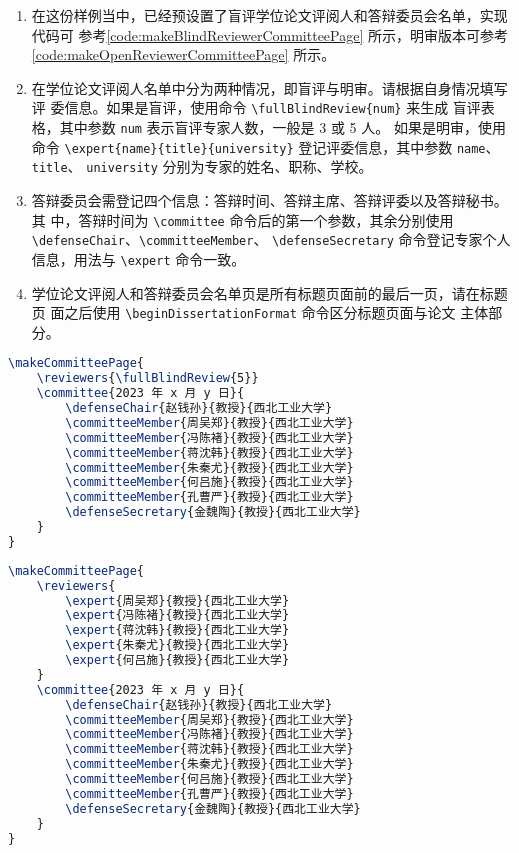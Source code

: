 \documentclass[lang=chs, degree=phd, blindreview=false, winfonts=true]{yanputhesis}
\begin{document}
\begin{enumerate}
    \setlength{\itemsep}{0pt}
    \item 在这份样例当中，已经预设置了盲评学位论文评阅人和答辩委员会名单，实现代码可
          参考\autoref{code:makeBlindReviewerCommitteePage} 所示，明审版本可参考
          \autoref{code:makeOpenReviewerCommitteePage} 所示。
    \item 在学位论文评阅人名单中分为两种情况，即盲评与明审。请根据自身情况填写评
          委信息。如果是盲评，使用命令 \lstinline`\fullBlindReview{num}` 来生成
          盲评表格，其中参数 \lstinline`num` 表示盲评专家人数，一般是 3 或 5 人。
          如果是明审，使用命令 \lstinline`\expert{name}{title}{university}`
          登记评委信息，其中参数 \lstinline`name`、\lstinline`title`、
          \lstinline`university` 分别为专家的姓名、职称、学校。
    \item 答辩委员会需登记四个信息：答辩时间、答辩主席、答辩评委以及答辩秘书。其
          中，答辩时间为 \lstinline`\committee` 命令后的第一个参数，其余分别使用
          \lstinline`\defenseChair`、\lstinline`\committeeMember`、
          \lstinline`\defenseSecretary` 命令登记专家个人信息，用法与
          \lstinline`\expert` 命令一致。
    \item 学位论文评阅人和答辩委员会名单页是所有标题页面前的最后一页，请在标题页
          面之后使用 \lstinline`\beginDissertationFormat` 命令区分标题页面与论文
          主体部分。
\end{enumerate}

\begin{lstlisting}[language={TeX}, label={code:makeBlindReviewerCommitteePage},
    caption={盲评样例 makeBlindReviewerCommitteePage.tex}]
\makeCommitteePage{
    \reviewers{\fullBlindReview{5}}
    \committee{2023 年 x 月 y 日}{
        \defenseChair{赵钱孙}{教授}{西北工业大学}
        \committeeMember{周吴郑}{教授}{西北工业大学}
        \committeeMember{冯陈褚}{教授}{西北工业大学}
        \committeeMember{蒋沈韩}{教授}{西北工业大学}
        \committeeMember{朱秦尤}{教授}{西北工业大学}
        \committeeMember{何吕施}{教授}{西北工业大学}
        \committeeMember{孔曹严}{教授}{西北工业大学}
        \defenseSecretary{金魏陶}{教授}{西北工业大学}
    }
}
\end{lstlisting}

\begin{lstlisting}[language={TeX}, label={code:makeOpenReviewerCommitteePage},
    caption={明审样例 makeOpenReviewerCommitteePage.tex}]
\makeCommitteePage{
    \reviewers{
        \expert{周吴郑}{教授}{西北工业大学}
        \expert{冯陈褚}{教授}{西北工业大学}
        \expert{蒋沈韩}{教授}{西北工业大学}
        \expert{朱秦尤}{教授}{西北工业大学}
        \expert{何吕施}{教授}{西北工业大学}
    }
    \committee{2023 年 x 月 y 日}{
        \defenseChair{赵钱孙}{教授}{西北工业大学}
        \committeeMember{周吴郑}{教授}{西北工业大学}
        \committeeMember{冯陈褚}{教授}{西北工业大学}
        \committeeMember{蒋沈韩}{教授}{西北工业大学}
        \committeeMember{朱秦尤}{教授}{西北工业大学}
        \committeeMember{何吕施}{教授}{西北工业大学}
        \committeeMember{孔曹严}{教授}{西北工业大学}
        \defenseSecretary{金魏陶}{教授}{西北工业大学}
    }
}
\end{lstlisting}
\end{document}
